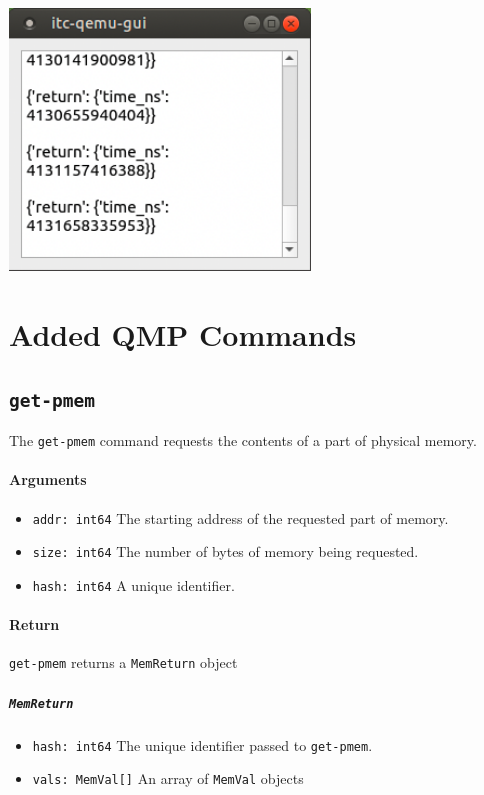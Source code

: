 \documentclass{article}
\newcommand{\code}[1]{\texttt{#1}}
\begin{document}
\begin{center}
    \includegraphics[width=80mm]{images/qmp-monitor-view.png}
\end{center}

\section{Added QMP Commands}

\subsection{\code{get-pmem}} \label{GetPmem}
The \code{get-pmem} command requests the contents of a part of physical memory.
\paragraph{Arguments}
\begin{itemize}
    \item \code{addr: int64}
        \subitem The starting address of the requested part of memory.
    \item \code{size: int64} 
        \subitem The number of bytes of memory being requested.
    \item \code{hash: int64} 
        \subitem A unique identifier.
\end{itemize}   
        
\paragraph{Return}
    \code{get-pmem} returns a \code{MemReturn} object
    \subparagraph{\code{MemReturn}}
    \begin{itemize}
        \item \code{hash: int64}
            \subitem The unique identifier passed to \code{get-pmem}.
        \item \code{vals: MemVal[]}
            \subitem An array of \code{MemVal} objects
    \end{itemize}
    
\end{document}
